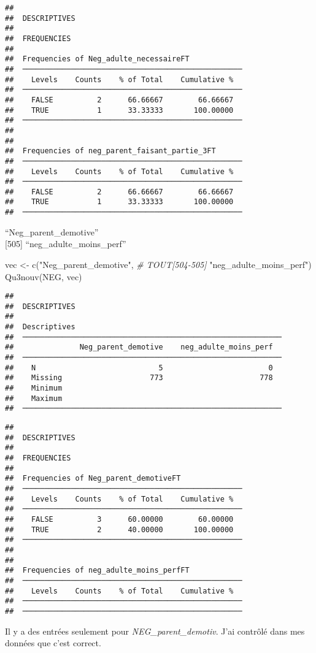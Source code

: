 \documentclass[
]{article}
\newenvironment{Shaded}{\begin{snugshade}}{\end{snugshade}}
\newcommand{\CommentTok}[1]{\textcolor[rgb]{0.56,0.35,0.01}{\textit{#1}}}
\newcommand{\FunctionTok}[1]{\textcolor[rgb]{0.00,0.00,0.00}{#1}}
\newcommand{\NormalTok}[1]{#1}
\newcommand{\OtherTok}[1]{\textcolor[rgb]{0.56,0.35,0.01}{#1}}
\newcommand{\StringTok}[1]{\textcolor[rgb]{0.31,0.60,0.02}{#1}}
\begin{document}
\begin{verbatim}
## 
##  DESCRIPTIVES
## 
##  FREQUENCIES
## 
##  Frequencies of Neg_adulte_necessaireFT             
##  ────────────────────────────────────────────────── 
##    Levels    Counts    % of Total    Cumulative %   
##  ────────────────────────────────────────────────── 
##    FALSE          2      66.66667        66.66667   
##    TRUE           1      33.33333       100.00000   
##  ────────────────────────────────────────────────── 
## 
## 
##  Frequencies of neg_parent_faisant_partie_3FT       
##  ────────────────────────────────────────────────── 
##    Levels    Counts    % of Total    Cumulative %   
##  ────────────────────────────────────────────────── 
##    FALSE          2      66.66667        66.66667   
##    TRUE           1      33.33333       100.00000   
##  ──────────────────────────────────────────────────
\end{verbatim}

``Neg\_parent\_demotive''\\
{[}505{]} ``neg\_adulte\_moins\_perf''

\begin{Shaded}
\begin{Highlighting}[]
\NormalTok{vec }\OtherTok{\textless{}{-}} \FunctionTok{c}\NormalTok{(}\StringTok{"Neg\_parent\_demotive"}\NormalTok{,                 }\CommentTok{\# TOUT[504{-}505]}
         \StringTok{"neg\_adulte\_moins\_perf"}\NormalTok{)}
\FunctionTok{Qu3nouv}\NormalTok{(NEG, vec)}
\end{Highlighting}
\end{Shaded}

\begin{verbatim}
## 
##  DESCRIPTIVES
## 
##  Descriptives                                                
##  ─────────────────────────────────────────────────────────── 
##               Neg_parent_demotive    neg_adulte_moins_perf   
##  ─────────────────────────────────────────────────────────── 
##    N                            5                        0   
##    Missing                    773                      778   
##    Minimum                                                   
##    Maximum                                                   
##  ───────────────────────────────────────────────────────────
\end{verbatim}

\begin{verbatim}
## 
##  DESCRIPTIVES
## 
##  FREQUENCIES
## 
##  Frequencies of Neg_parent_demotiveFT               
##  ────────────────────────────────────────────────── 
##    Levels    Counts    % of Total    Cumulative %   
##  ────────────────────────────────────────────────── 
##    FALSE          3      60.00000        60.00000   
##    TRUE           2      40.00000       100.00000   
##  ────────────────────────────────────────────────── 
## 
## 
##  Frequencies of neg_adulte_moins_perfFT             
##  ────────────────────────────────────────────────── 
##    Levels    Counts    % of Total    Cumulative %   
##  ────────────────────────────────────────────────── 
##  ──────────────────────────────────────────────────
\end{verbatim}

Il y a des entrées seulement pour \emph{NEG\_parent\_demotiv}. J'ai
contrôlé dans mes données que c'est correct.
\end{document}
